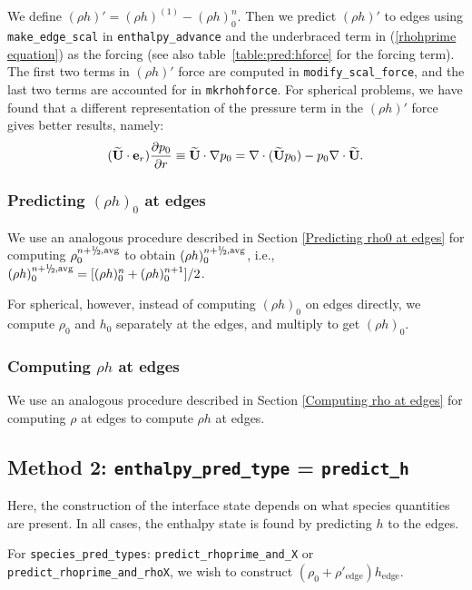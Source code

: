 We define $(\rho h)' = (\rho h)^{(1)} - (\rho h)_0^n$.  Then we predict 
$(\rho h)'$ to edges using {\tt make\_edge\_scal} in {\tt enthalpy\_advance} 
and the underbraced term in (\ref{rhohprime equation}) as the forcing (see
also table~\ref{table:pred:hforce} for the forcing term).
The first two terms in $(\rho h)'$ force are computed in 
{\tt modify\_scal\_force}, and the last two terms are accounted for in
{\tt mkrhohforce}.  For spherical problems, we have found that a different 
representation of the pressure term in the $(\rho h)'$ force gives better
results, namely:
\begin{equation}
(\widetilde{{\bf U}} \cdot \mathbf{e}_r)\frac{\partial p_0}{\partial r} \equiv \widetilde{{\bf U}}\cdot\nabla p_0 = 
\nabla\cdot(\widetilde{{\bf U}} p_0) - p_0\nabla\cdot\widetilde{{\bf U}}.
\end{equation}



\subsubsection{Predicting $(\rho h)_0$ at edges}
We use an analogous procedure described in Section \ref{Predicting
rho0 at edges} for computing $\rho_0^{n+\myhalf,\rm{avg}}$ to obtain 
$(\rho h)_0^{n+\myhalf,\rm{avg}}$, i.e., 
$(\rho h)_0^{n+\myhalf,{\rm avg}} = [(\rho h)_0^{n} + (\rho h)_0^{n+1}]/2$.

For spherical, however, instead of computing $(\rho h)_0$ on edges
directly, we compute $\rho_0$ and $h_0$ separately at the edges, and
multiply to get $(\rho h)_0$.


\subsubsection{Computing $\rho h$ at edges}
We use an analogous procedure described in Section \ref{Computing rho
  at edges} for computing $\rho$ at edges to compute $\rho h$ at
edges.  


\subsection{Method 2: {\tt enthalpy\_pred\_type} = {\tt predict\_h}}

Here, the construction of the interface state depends on what species 
quantities are present.  In all cases, the enthalpy state is found
by predicting $h$ to the edges.


For {\tt species\_pred\_types}: {\tt predict\_rhoprime\_and\_X} or
{\tt predict\_rhoprime\_and\_rhoX}, we wish to construct $(\rho_0 +
\rho'_\mathrm{edge} ) h_\mathrm{edge}$.

